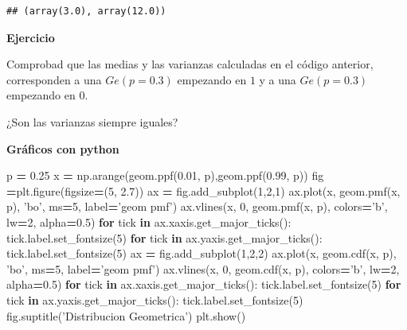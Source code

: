 \documentclass[]{book}
\newenvironment{Shaded}{\begin{snugshade}}{\end{snugshade}}
\newcommand{\ControlFlowTok}[1]{\textcolor[rgb]{0.13,0.29,0.53}{\textbf{#1}}}
\newcommand{\DecValTok}[1]{\textcolor[rgb]{0.00,0.00,0.81}{#1}}
\newcommand{\FloatTok}[1]{\textcolor[rgb]{0.00,0.00,0.81}{#1}}
\newcommand{\KeywordTok}[1]{\textcolor[rgb]{0.13,0.29,0.53}{\textbf{#1}}}
\newcommand{\NormalTok}[1]{#1}
\newcommand{\OperatorTok}[1]{\textcolor[rgb]{0.81,0.36,0.00}{\textbf{#1}}}
\newcommand{\StringTok}[1]{\textcolor[rgb]{0.31,0.60,0.02}{#1}}
\begin{document}
\begin{verbatim}
## (array(3.0), array(12.0))
\end{verbatim}

\textbf{Ejercicio}

Comprobad que las medias y las varianzas calculadas en el código anterior, corresponden a una \(Ge(p=0.3)\) empezando en \(1\) y a una \(Ge(p=0.3)\) empezando en \(0\).

¿Son las varianzas siempre iguales?

\textbf{Gráficos con python}

\begin{Shaded}
\begin{Highlighting}[]
\NormalTok{p }\OperatorTok{=} \FloatTok{0.25}
\NormalTok{x }\OperatorTok{=}\NormalTok{ np.arange(geom.ppf(}\FloatTok{0.01}\NormalTok{, p),geom.ppf(}\FloatTok{0.99}\NormalTok{, p))}
\NormalTok{fig }\OperatorTok{=}\NormalTok{plt.figure(figsize}\OperatorTok{=}\NormalTok{(}\DecValTok{5}\NormalTok{, }\FloatTok{2.7}\NormalTok{))}
\NormalTok{ax }\OperatorTok{=}\NormalTok{ fig.add_subplot(}\DecValTok{1}\NormalTok{,}\DecValTok{2}\NormalTok{,}\DecValTok{1}\NormalTok{)}
\NormalTok{ax.plot(x, geom.pmf(x, p), }\StringTok{'bo'}\NormalTok{, ms}\OperatorTok{=}\DecValTok{5}\NormalTok{, label}\OperatorTok{=}\StringTok{'geom pmf'}\NormalTok{)}
\NormalTok{ax.vlines(x, }\DecValTok{0}\NormalTok{, geom.pmf(x, p), colors}\OperatorTok{=}\StringTok{'b'}\NormalTok{, lw}\OperatorTok{=}\DecValTok{2}\NormalTok{, alpha}\OperatorTok{=}\FloatTok{0.5}\NormalTok{)}
\ControlFlowTok{for}\NormalTok{ tick }\KeywordTok{in}\NormalTok{ ax.xaxis.get_major_ticks():}
\NormalTok{  tick.label.set_fontsize(}\DecValTok{5}\NormalTok{)}
\ControlFlowTok{for}\NormalTok{ tick }\KeywordTok{in}\NormalTok{ ax.yaxis.get_major_ticks():}
\NormalTok{  tick.label.set_fontsize(}\DecValTok{5}\NormalTok{) }
\NormalTok{ax }\OperatorTok{=}\NormalTok{ fig.add_subplot(}\DecValTok{1}\NormalTok{,}\DecValTok{2}\NormalTok{,}\DecValTok{2}\NormalTok{)}
\NormalTok{ax.plot(x, geom.cdf(x, p), }\StringTok{'bo'}\NormalTok{, ms}\OperatorTok{=}\DecValTok{5}\NormalTok{, label}\OperatorTok{=}\StringTok{'geom pmf'}\NormalTok{)}
\NormalTok{ax.vlines(x, }\DecValTok{0}\NormalTok{, geom.cdf(x, p), colors}\OperatorTok{=}\StringTok{'b'}\NormalTok{, lw}\OperatorTok{=}\DecValTok{2}\NormalTok{, alpha}\OperatorTok{=}\FloatTok{0.5}\NormalTok{)}
\ControlFlowTok{for}\NormalTok{ tick }\KeywordTok{in}\NormalTok{ ax.xaxis.get_major_ticks():}
\NormalTok{  tick.label.set_fontsize(}\DecValTok{5}\NormalTok{)}
\ControlFlowTok{for}\NormalTok{ tick }\KeywordTok{in}\NormalTok{ ax.yaxis.get_major_ticks():}
\NormalTok{  tick.label.set_fontsize(}\DecValTok{5}\NormalTok{)}
\NormalTok{fig.suptitle(}\StringTok{'Distribucion Geometrica'}\NormalTok{)}
\NormalTok{plt.show()}
\end{Highlighting}
\end{Shaded}
\end{document}
